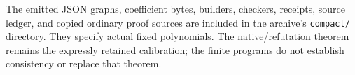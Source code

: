 The emitted JSON graphs, coefficient bytes, builders, checkers,
receipts, source ledger, and copied ordinary proof sources are included
in the archive's \texttt{compact/} directory.  They specify actual fixed
polynomials.  The native/refutation theorem remains the expressly
retained calibration; the finite programs do not establish consistency
or replace that theorem.
